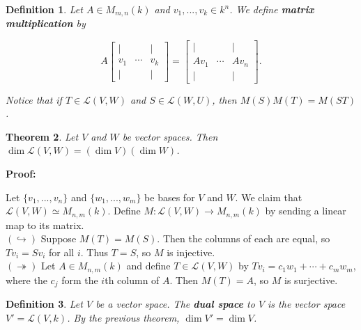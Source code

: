 \documentclass{article}
\theoremstyle{colontheorem}
\newtheorem{theorem}{Theorem}[section]
\newtheorem{definition}[theorem]{Definition}
\newenvironment{Theorem}
{
	\begin{mdframed}[backgroundcolor=TheoremOrange!10]
	\begin{theorem}
}
{
	\end{theorem}
	\end{mdframed}
	
	\vspace{.15in}
}
\newenvironment{Def}
{
	\begin{mdframed}[backgroundcolor=DefGreen!10]
	\begin{definition}
}
{
	\end{definition}
	\end{mdframed}
	
	\vspace{.15in}
}
\newenvironment{Proof}
{
	\vspace{-.3in}
	
	\begin{mdframed}[backgroundcolor=ProofPurple!10]
	\textbf{Proof:}%
}
{
	\end{mdframed}
	
	\vspace{.15in}
}
\begin{document}
\begin{Def}
	
	Let $A \in M_{m, n}(k)$ and $v_1, ..., v_k \in k^n$. We define \textbf{matrix multiplication} by
	
	$$
		A \begin{bmatrix}
			| & & |\\
			v_1 & \cdots & v_k\\
			| & & |
		\end{bmatrix} = \begin{bmatrix}
			| & & |\\
			Av_1 & \cdots & Av_n\\
			| & & |
		\end{bmatrix}.
	$$
	
	Notice that if $T \in \mathcal{L}(V,W)$ and $S \in \mathcal{L}(W,U)$, then $M(S) M(T) = M(ST)$.
	
\end{Def}




\begin{Theorem}
	
	Let $V$ and $W$ be vector spaces. Then $\dim \mathcal{L}(V,W) = (\dim V)(\dim W)$.
	
\end{Theorem}



\begin{Proof}
	Let $\{v_1, ..., v_n\}$ and $\{w_1, ..., w_m\}$ be bases for $V$ and $W$. We claim that $\mathcal{L}(V,W) \simeq M_{n, m}(k)$. Define $M : \mathcal{L}(V,W) \longrightarrow M_{n, m}(k)$ by sending a linear map to its matrix.\\
	
	$(\hookrightarrow)$ Suppose $M(T) = M(S)$. Then the columns of each are equal, so $Tv_i = Sv_i$ for all $i$. Thus $T = S$, so $M$ is injective.\\
	
	$(\twoheadrightarrow)$ Let $A \in M_{n, m}(k)$ and define $T \in \mathcal{L}(V,W)$ by $Tv_i = c_1 w_1 + \cdots + c_m w_m$, where the $c_j$ form the $i$th column of $A$. Then $M(T) = A$, so $M$ is surjective.
	
\end{Proof}



\begin{Def}
	
	Let $V$ be a vector space. The \textbf{dual space} to $V$ is the vector space $V' = \mathcal{L}(V, k)$. By the previous theorem, $\dim V' = \dim V$.
	
\end{Def}
\end{document}
